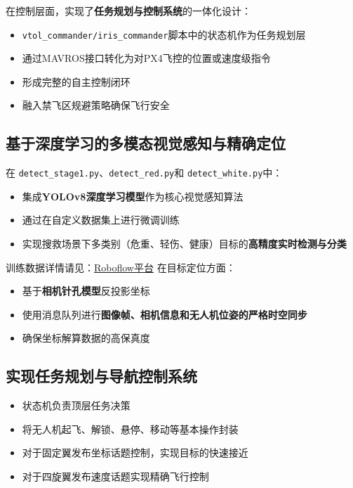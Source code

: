 \documentclass[12pt]{article}
\begin{document}
在控制层面，实现了\textbf{任务规划与控制系统}的一体化设计：
\begin{itemize}
    \item \texttt{vtol\_commander/iris\_commander}脚本中的状态机作为任务规划层
    \item 通过MAVROS接口转化为对PX4飞控的位置或速度级指令
    \item 形成完整的自主控制闭环
    \item 融入禁飞区规避策略确保飞行安全
\end{itemize}

\subsection{基于深度学习的多模态视觉感知与精确定位}
在 \texttt{detect\_stage1.py}、\texttt{detect\_red.py}和 \texttt{detect\_white.py}中：
\begin{itemize}
    \item 集成\textbf{YOLOv8深度学习模型}作为核心视觉感知算法
    \item 通过在自定义数据集上进行微调训练
    \item 实现搜救场景下多类别（危重、轻伤、健康）目标的\textbf{高精度实时检测与分类}
\end{itemize}

训练数据详情请见：\href{https://app.roboflow.com/join/eyJhbGciOiJIUzI1NiIsInR5cCI6IkpXVCJ9.eyJ3b3Jrc3BhY2VJZCI6IlQ4VGZpZ0FqQkdOMWIzT1pITjNNMUJ3dDNoazIiLCJyb2xlIjoib3duZXIiLCJpbnZpdGVyIjoiaGFpa2U4MjZAZ21haWwuY29tIiwiaWF0IjoxNzUzNjc5NTUzfQ.ksRN2pjtnuXkUIybOxv0PoRmLFUzQssGo_Zjj3tStE0}{Roboflow平台}
在目标定位方面：
\begin{itemize}
    \item 基于\textbf{相机针孔模型}反投影坐标
    \item 使用消息队列进行\textbf{图像帧、相机信息和无人机位姿的严格时空同步}
    \item 确保坐标解算数据的高保真度
\end{itemize}

\subsection{实现任务规划与导航控制系统}
\begin{itemize}
    \item 状态机负责顶层任务决策
    \item 将无人机起飞、解锁、悬停、移动等基本操作封装
    \item 对于固定翼发布坐标话题控制，实现目标的快速接近
    \item 对于四旋翼发布速度话题实现精确飞行控制
\end{itemize}
\end{document}
